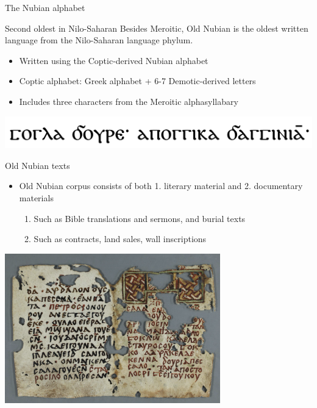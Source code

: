 \documentclass{beamer}
\begin{document}
\begin{frame}{The Nubian alphabet}
  \begin{block}{Second oldest in Nilo-Saharan}
    Besides Meroitic, Old Nubian is the oldest written language from the Nilo-Saharan language 
    phylum.
  \end{block}
  \begin{itemize}
    \item Written using the Coptic-derived Nubian alphabet
    \item Coptic alphabet: Greek alphabet + 6-7 Demotic-derived letters
    \item Includes three characters from the Meroitic alphasyllabary
  \end{itemize}
\begin{center}
\includegraphics[width=1.0\textwidth]{ontext.png}
\end{center}
\end{frame}

\begin{frame}{Old Nubian texts}
  \begin{itemize}
    \item Old Nubian corpus consists of both 1. literary material and 2. documentary materials
    \begin{enumerate}
      \item Such as Bible translations and sermons, and burial texts
      \item Such as contracts, land sales, wall inscriptions
    \end{enumerate}
  \end{itemize}
  \begin{center}
\includegraphics[width=0.7\textwidth]{St-f2r.jpg}
\end{center}
\end{frame}
\end{document}
